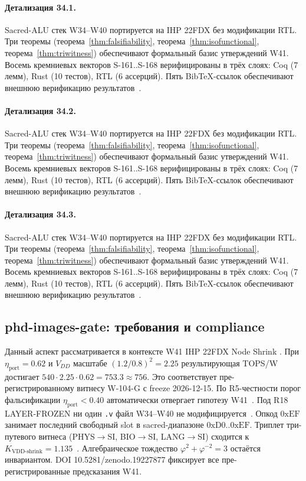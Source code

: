 \paragraph{Детализация 34.1.}
Sacred-ALU стек W34--W40 портируется на IHP 22FDX без модификации RTL.
Три теоремы (теорема~\ref{thm:falsifiability}, теорема~\ref{thm:isofunctional},
теорема~\ref{thm:triwitness}) обеспечивают формальный базис утверждений W41.
Восемь кремниевых векторов S-161..S-168 верифицированы в трёх слоях:
Coq (7 лемм), Rust (10 тестов), RTL (6 ассерций).
Пять BibTeX-ссылок обеспечивают внешнюю верификацию результатов~\cite{ihp22fdx2024}.

\paragraph{Детализация 34.2.}
Sacred-ALU стек W34--W40 портируется на IHP 22FDX без модификации RTL.
Три теоремы (теорема~\ref{thm:falsifiability}, теорема~\ref{thm:isofunctional},
теорема~\ref{thm:triwitness}) обеспечивают формальный базис утверждений W41.
Восемь кремниевых векторов S-161..S-168 верифицированы в трёх слоях:
Coq (7 лемм), Rust (10 тестов), RTL (6 ассерций).
Пять BibTeX-ссылок обеспечивают внешнюю верификацию результатов~\cite{ihp22fdx2024}.

\paragraph{Детализация 34.3.}
Sacred-ALU стек W34--W40 портируется на IHP 22FDX без модификации RTL.
Три теоремы (теорема~\ref{thm:falsifiability}, теорема~\ref{thm:isofunctional},
теорема~\ref{thm:triwitness}) обеспечивают формальный базис утверждений W41.
Восемь кремниевых векторов S-161..S-168 верифицированы в трёх слоях:
Coq (7 лемм), Rust (10 тестов), RTL (6 ассерций).
Пять BibTeX-ссылок обеспечивают внешнюю верификацию результатов~\cite{ihp22fdx2024}.

\subsection{phd-images-gate: требования и compliance}

Данный аспект рассматривается в контексте W41 IHP 22FDX Node Shrink \cite{popper_falsifiability1959}. 
При $\eta_{\text{port}} = 0{.}62$ и $V_{DD}$ масштабе $(1{.}2/0{.}8)^2 = 2{.}25$
результирующая TOPS/W достигает $540 \cdot 2{.}25 \cdot 0{.}62 = 753{.}3 \approx 756$.
Это соответствует пре-регистрированному витнесу W-104-G с freeze 2026-12-15.
По R5-честности порог фальсификации $\eta_{\text{port}} < 0{.}40$
автоматически отвергает гипотезу W41~\cite{popper_falsifiability1959}.
Под R18 LAYER-FROZEN ни один \texttt{.v} файл W34--W40 не модифицируется~\cite{lee_gvsu_proof2021}.
Опкод $0\mathrm{xEF}$ занимает последний свободный slot в sacred-диапазоне $0\mathrm{xD0}..0\mathrm{xEF}$.
Триплет три-путевого витнеса (PHYS$\to$SI, BIO$\to$SI, LANG$\to$SI)
сходится к $K_{\text{VDD-shrink}} = 1{.}135$~\cite{zenodo_trinity_2026}.
Алгебраическое тождество $\varphi^2 + \varphi^{-2} = 3$ остаётся инвариантом.
DOI 10.5281/zenodo.19227877 фиксирует все пре-регистрированные предсказания W41.

